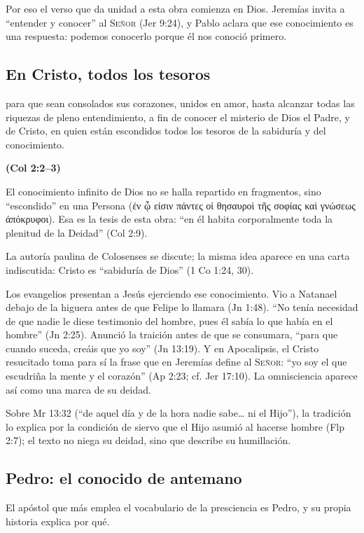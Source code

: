 \documentclass[11pt,letterpaper]{article}
\newcommand{\grc}[1]{\foreignlanguage{ancientgreek}{#1}}
\newcommand{\SENOR}{\textsc{Señor}}
\newcommand{\fuente}[1]{\par\hfill{\upshape\bfseries\small\textcolor{azul}{#1}}}
\begin{document}
Por eso el verso que da unidad a esta obra comienza en Dios. Jeremías invita a ``entender y conocer'' al \SENOR{} (Jer 9:24), y Pablo aclara que ese conocimiento es una respuesta: podemos conocerlo porque él nos conoció primero.

\subsection{En Cristo, todos los tesoros}

\begin{cita}para que sean consolados sus corazones, unidos en amor, hasta alcanzar todas las riquezas de pleno entendimiento, a fin de conocer el misterio de Dios el Padre, y de Cristo, en quien están escondidos todos los tesoros de la sabiduría y del conocimiento.\fuente{(Col 2:2--3)}\end{cita}

El conocimiento infinito de Dios no se halla repartido en fragmentos, sino ``escondido'' en una Persona (\grc{ἐν ᾧ εἰσιν πάντες οἱ θησαυροὶ τῆς σοφίας καὶ γνώσεως ἀπόκρυφοι}). Esa es la tesis de esta obra: ``en él habita corporalmente toda la plenitud de la Deidad'' (Col 2:9).

\begin{nota}[Precisión]
La autoría paulina de Colosenses se discute; la misma idea aparece en una carta indiscutida: Cristo es ``sabiduría de Dios'' (1 Co 1:24, 30).
\end{nota}

Los evangelios presentan a Jesús ejerciendo ese conocimiento. Vio a Natanael debajo de la higuera antes de que Felipe lo llamara (Jn 1:48). ``No tenía necesidad de que nadie le diese testimonio del hombre, pues él sabía lo que había en el hombre'' (Jn 2:25). Anunció la traición antes de que se consumara, ``para que cuando suceda, creáis que yo soy'' (Jn 13:19). Y en Apocalipsis, el Cristo resucitado toma para sí la frase que en Jeremías define al \SENOR{}: ``yo soy el que escudriña la mente y el corazón'' (Ap 2:23; cf. Jer 17:10). La omnisciencia aparece así como una marca de su deidad.

\begin{nota}[Precisión]
Sobre Mr 13:32 (``de aquel día y de la hora nadie sabe\ldots{} ni el Hijo''), la tradición lo explica por la condición de siervo que el Hijo asumió al hacerse hombre (Flp 2:7); el texto no niega su deidad, sino que describe su humillación.
\end{nota}

\subsection{Pedro: el conocido de antemano}
El apóstol que más emplea el vocabulario de la presciencia es Pedro, y su propia historia explica por qué.
\end{document}
